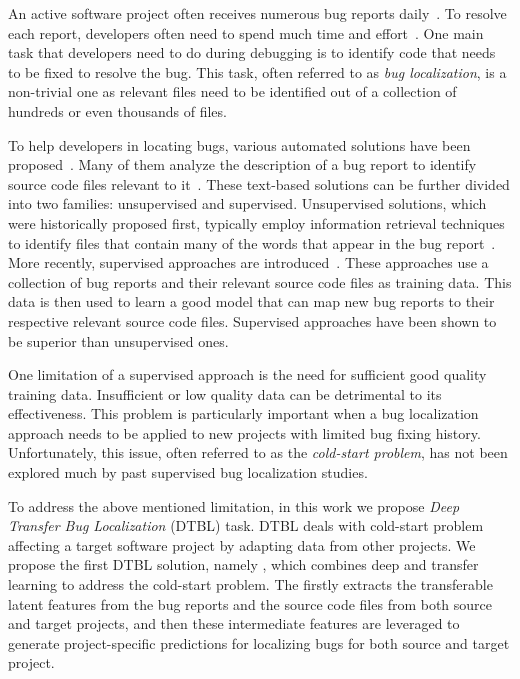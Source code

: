 An active software project often receives numerous bug reports daily~\cite{AnvikHM05}. To resolve each report, developers often need to spend much time and effort~\cite{Tassey02}. One main task that developers need to do during debugging is to identify code that needs to be fixed to resolve the bug. This task, often referred to as {\em bug localization}, is a non-trivial one as relevant files need to be identified out of a collection of hundreds or even thousands of files.

To help developers in locating bugs, various automated solutions have been proposed~\cite{JonesH05,lukins2008source,rao2011retrieval,SahaLKP14,huo2016learning}. Many of them analyze the description of a bug report to identify source code files relevant to it~\cite{lukins2008source,rao2011retrieval,SahaLKP14,huo2016learning}. These text-based solutions can be further divided into two families: unsupervised and supervised. Unsupervised solutions, which were historically proposed first, typically employ information retrieval techniques to identify files that contain many of the words that appear in the bug report~\cite{lukins2008source,rao2011retrieval,SahaLKP14}. More recently, supervised approaches are introduced~\cite{huo2016learning}. These approaches use a collection of bug reports and their relevant source code files as training data. This data is then used to learn a good model that can map new bug reports to their respective relevant source code files. Supervised approaches have been shown to be superior than unsupervised ones.

One limitation of a supervised approach is the need for sufficient good quality training data. Insufficient or low quality data can be detrimental to its effectiveness. This problem is particularly important when a bug localization approach needs to be applied to new projects with limited bug fixing history. Unfortunately, this issue, often referred to as the {\em cold-start problem}, has not been explored much by past supervised bug localization studies.

To address the above mentioned limitation, in this work we propose {\em Deep Transfer Bug Localization} (DTBL) task. DTBL deals with cold-start problem affecting a target software project by adapting data from other projects. We propose the first DTBL solution, namely \TRANPCNN, which combines deep and transfer learning to address the cold-start problem. The \TRANPCNN firstly extracts the transferable latent features from the bug reports and the source code files from both source and target projects, and then these intermediate features are leveraged to generate project-specific predictions for localizing bugs for both source and target project.  

